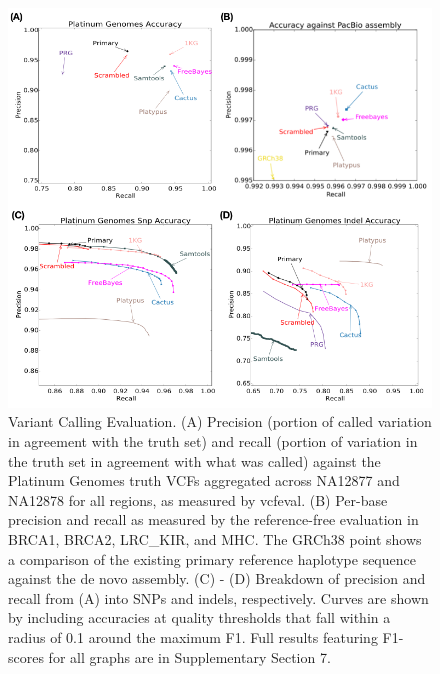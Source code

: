 \begin{figure}[htbp]
\centering
\includegraphics[width=\textwidth]{figures/04_bakeoff/figure04.png}
\caption[Variant Calling Evaluation]{Variant Calling Evaluation. (A) Precision (portion of called
variation in agreement with the truth set) and recall (portion of
variation in the truth set in agreement with what was called) against
the Platinum Genomes truth VCFs aggregated across NA12877 and NA12878
for all regions, as measured by vcfeval. (B) Per-base precision and
recall as measured by the reference-free evaluation in BRCA1, BRCA2,
LRC\_KIR, and MHC. The GRCh38 point shows a comparison of the existing
primary reference haplotype sequence against the de novo assembly. (C) -
(D) Breakdown of precision and recall from (A) into SNPs and indels,
respectively. Curves are shown by including accuracies at quality
thresholds that fall within a radius of 0.1 around the maximum F1. Full
results featuring F1-scores for all graphs are in Supplementary Section
7.}
\label{fig:bakeoff:callingeval}
\end{figure}

